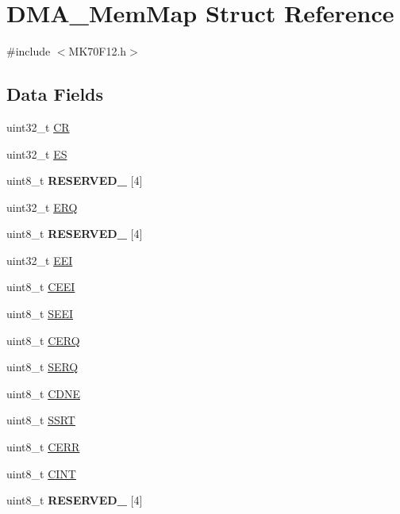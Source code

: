 \hypertarget{struct_d_m_a___mem_map}{}\section{D\+M\+A\+\_\+\+Mem\+Map Struct Reference}
\label{struct_d_m_a___mem_map}


{\ttfamily \#include $<$M\+K70\+F12.\+h$>$}

\subsection*{Data Fields}
\begin{DoxyCompactItemize}
\item 
uint32\+\_\+t \hyperlink{struct_d_m_a___mem_map_ac2a6179596986e5c7b8794eaab4166e3}{C\+R}
\item 
uint32\+\_\+t \hyperlink{struct_d_m_a___mem_map_a4c51938d27cc66f0d060c66ec7089ec7}{E\+S}
\item 
\hypertarget{struct_d_m_a___mem_map_a7cc0580f48946ba6e50ff6e576b20ab4}{}uint8\+\_\+t {\bfseries R\+E\+S\+E\+R\+V\+E\+D\+\_} \mbox{[}4\mbox{]}\label{struct_d_m_a___mem_map_a7cc0580f48946ba6e50ff6e576b20ab4}

\item 
uint32\+\_\+t \hyperlink{struct_d_m_a___mem_map_a5dd80d7a64d93b113f306641b42d4365}{E\+R\+Q}
\item 
\hypertarget{struct_d_m_a___mem_map_ade1056cf9364888e2d2a33ab9ab6d9b5}{}uint8\+\_\+t {\bfseries R\+E\+S\+E\+R\+V\+E\+D\+\_} \mbox{[}4\mbox{]}\label{struct_d_m_a___mem_map_ade1056cf9364888e2d2a33ab9ab6d9b5}

\item 
uint32\+\_\+t \hyperlink{struct_d_m_a___mem_map_af6d4e36800f891e548be42bb47e36aef}{E\+E\+I}
\item 
uint8\+\_\+t \hyperlink{struct_d_m_a___mem_map_a02b835eb33ce21b8b3170304a72fccc2}{C\+E\+E\+I}
\item 
uint8\+\_\+t \hyperlink{struct_d_m_a___mem_map_a576075e4d10859c84e48e7abc1e030aa}{S\+E\+E\+I}
\item 
uint8\+\_\+t \hyperlink{struct_d_m_a___mem_map_a1e78a98a5a2aca80d229f7c055dc9ff1}{C\+E\+R\+Q}
\item 
uint8\+\_\+t \hyperlink{struct_d_m_a___mem_map_ac6934aad6952b966b2d0bed0e5d4d58c}{S\+E\+R\+Q}
\item 
uint8\+\_\+t \hyperlink{struct_d_m_a___mem_map_ab41bdc9f4302f141db34641e6cf21e85}{C\+D\+N\+E}
\item 
uint8\+\_\+t \hyperlink{struct_d_m_a___mem_map_a39ea12b8e20431f54f8c6ba9f08bfc1b}{S\+S\+R\+T}
\item 
uint8\+\_\+t \hyperlink{struct_d_m_a___mem_map_acb163ebc8fa00a1bdc82b3e8324d4b23}{C\+E\+R\+R}
\item 
uint8\+\_\+t \hyperlink{struct_d_m_a___mem_map_a1a3708788fc9260a7392a51485629884}{C\+I\+N\+T}
\item 
\hypertarget{struct_d_m_a___mem_map_ac93232aa280b0be64323e7c32a304244}{}uint8\+\_\+t {\bfseries R\+E\+S\+E\+R\+V\+E\+D\+\_} \mbox{[}4\mbox{]}\label{struct_d_m_a___mem_map_ac93232aa280b0be64323e7c32a304244}


\end{DoxyCompactItemize}

